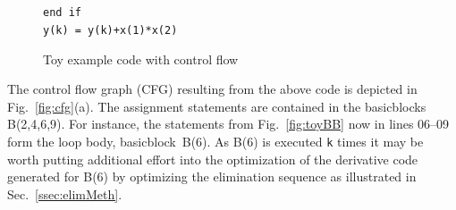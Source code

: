 \documentclass[11pt]{article}
\newcommand{\basicblock}{basicblock}
\newcommand{\code}[1]{{\small\tt{#1}}}
\newcommand{\refsec}[1]{{Sec.~\ref{#1}}}
\newcommand{\reffig}[1]{{Fig.~\ref{#1}}}
\begin{document}
\begin{figure}
\begin{center}
\begin{minipage}{.5\textwidth}
\begin{tabbing}
        \hspace{.6cm}{\footnotesize \bf 09}\hspace{.5cm} \> \\
        \hspace{.6cm}{\footnotesize \bf 10}\hspace{.5cm}  \\
        \hspace{.6cm}{\footnotesize \bf 11}\hspace{.5cm} {\tt end if } \\
        \hspace{.6cm}{\footnotesize \bf 12}\hspace{.5cm} {\tt y(k) = y(k)+x(1)*x(2) } 
      \end{tabbing}
    \end{minipage}
  \end{center}
  \caption{Toy example code with control flow}\label{fig:toy}
\end{figure}
The control flow graph (CFG) \cite{ASU86} resulting from the above code is depicted in 
\reffig{fig:cfg}(a).
The assignment statements are contained in the {\basicblock}s B(2,4,6,9).
For instance, 
the statements from \reffig{fig:toyBB} now  in lines 06--09 form the loop body, \basicblock\ B(6).
As B(6) is executed
\code{k} times it may be worth putting
additional effort into the optimization of the derivative code 
generated for B(6) by optimizing the elimination sequence as illustrated in 
\refsec{ssec:elimMeth}.
\end{document}
